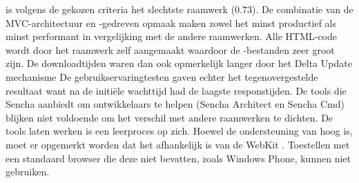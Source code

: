 \st{} is volgens de gekozen criteria het slechtste raamwerk ($0.73$).
De combinatie van de MVC-architectuur en \js-gedreven opmaak maken \st{} zowel het minst productief als minst performant in vergelijking met de andere raamwerken.
Alle HTML-code wordt door het raamwerk zelf aangemaakt waardoor de \js-bestanden zeer groot zijn.
De downloadtijden waren dan ook opmerkelijk langer door het Delta Update mechanisme
De gebruikservaringtesten gaven echter het tegenovergestelde resultaat want na de initiële wachttijd had \st{} de laagste responstijden.
De tools die Sencha aanbiedt om ontwikkelaars te helpen (Sencha Architect en Sencha Cmd) blijken niet voldoende om het verschil met andere raamwerken te dichten.
De tools laten werken is een leerproces op zich.
Hoewel de ondersteuning van \st{} hoog is, moet er opgemerkt worden dat het afhankelijk is van de WebKit .
Toestellen met een standaard browser die deze  niet bevatten, zoals Windows Phone,  kunnen \st{} niet gebruiken.














